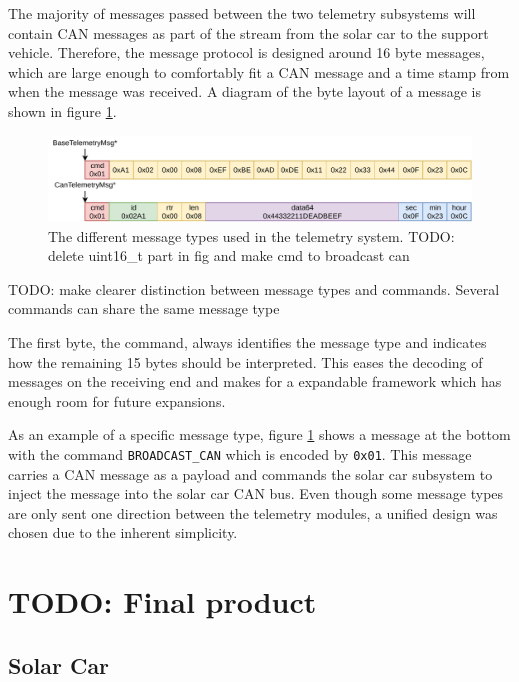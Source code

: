 \documentclass[conference]{IEEEtran}
\newcommand{\todo}[1]{{\color{olive} TODO: #1}}
\begin{document}
The majority of messages passed between the two telemetry subsystems will contain CAN messages as part of the stream from the solar car to the support vehicle. Therefore, the message protocol is designed around 16 byte messages, which are large enough to comfortably fit a CAN message and a time stamp from when the message was received. A diagram of the byte layout of a message is shown in figure \ref{fig:messageTypes}.

\begin{figure}
    \centering
    \includegraphics[width=\linewidth]{documentation/images/MessageTypes.pdf}
    \caption{The different message types used in the telemetry system.\todo{delete uint16\_t part in fig and make cmd to broadcast can}}
    \label{fig:messageTypes}
\end{figure}

\todo{make clearer distinction between message types and commands. Several commands can share the same message type}

The first byte, the command, always identifies the message type and indicates how the remaining 15 bytes should be interpreted. This eases the decoding of messages on the receiving end and makes for a expandable framework which has enough room for future expansions. 

As an example of a specific message type, figure \ref{fig:messageTypes} shows a message at the bottom with the command \texttt{BROADCAST\_CAN} which is encoded by \texttt{0x01}. This message carries a CAN message as a payload and commands the solar car subsystem to inject the message into the solar car CAN bus. Even though some message types are only sent one direction between the telemetry modules, a unified design was chosen due to the inherent simplicity.





\section{\todo{Final product}}
\subsection{Solar Car}
\end{document}
